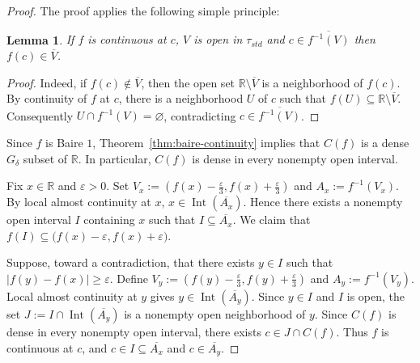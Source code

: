 \documentclass[11pt]{amsart} %
\newtheorem{lemma}[theorem]{Lemma}
\theoremstyle{definition}
\begin{document}
\begin{proof}

The proof applies the following simple principle: 
\begin{lemma} 
If $f$ is continuous at $c$, $V$ is open in $\tau_{std}$  and $c\in \overline{f^{-1}(V)}$ then $f(c)\in \overline{V}$. 
\label{lemma:cont}
\end{lemma} 
\begin{proof} 
Indeed, if $f(c)\notin\overline{V}$, then the open set
$\mathbb{R}\setminus\overline{V}$ is a neighborhood of $f(c)$. By
continuity of $f$ at $c$, there is a neighborhood $U$ of $c$ such that $f(U)\subseteq \mathbb{R}\setminus\overline{V}$.  
Consequently $U\cap f^{-1}(V)=\varnothing$, contradicting
$c\in\overline{f^{-1}(V)}$.

\end{proof} 

Since $f$ is Baire $1$, Theorem~\ref{thm:baire-continuity}  implies that
$C(f)$ is a dense $G_\delta$ subset of $\mathbb{R}$. In particular,
$C(f)$ is dense in every nonempty open interval.

Fix $x\in\mathbb{R}$ and $\varepsilon>0$. Set
$
    V_x:=\left(f(x)-\frac{\varepsilon}{3},
               f(x)+\frac{\varepsilon}{3}\right)$ and 
    $A_x:=f^{-1}(V_x).$
By local almost continuity at $x$,
$x\in \operatorname{Int}(\overline{A_x}).$
Hence there exists a nonempty open interval $I$ containing $x$ such that $
    I\subseteq \overline{A_x}.$
We claim that $f(I)\subseteq \bigl(f(x)-\varepsilon,f(x)+\varepsilon\bigr)$. 

Suppose, toward a contradiction, that there exists $y\in I$ such that $
    |f(y)-f(x)|\geq \varepsilon.$ 
Define $V_y:=\left(f(y)-\frac{\varepsilon}{3},
               f(y)+\frac{\varepsilon}{3}\right)$
   and 
    $A_y:=f^{-1}(V_y).$
Local almost continuity at $y$ gives
 $y\in \operatorname{Int}(\overline{A_y}).$
Since $y\in I$ and $I$ is open, the set
$J:=I\cap \operatorname{Int}(\overline{A_y})$ 
is a nonempty open neighborhood of $y$. Since $C(f)$ is dense in every
nonempty open interval, there exists $
    c\in J\cap C(f).$ 
Thus $f$ is continuous at $c$, and $
    c\in I\subseteq \overline{A_x}$ and $c\in \overline{A_y}.$




\end{proof}
\end{document}
